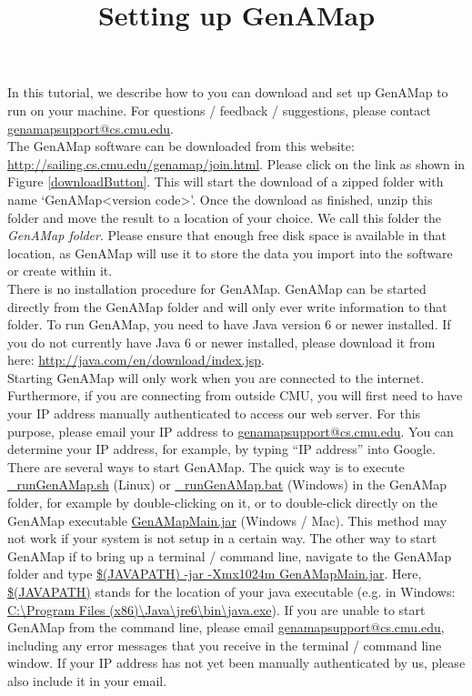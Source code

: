 \documentclass{article}
\title{Setting up GenAMap}
\author{}
\date{}
\begin{document}
\maketitle


In this tutorial, we describe how to you can download and set up GenAMap to run on your machine. For questions / feedback / suggestions, please contact \url{genamapsupport@cs.cmu.edu}.\\

The GenAMap software can be downloaded from this website: \url{http://sailing.cs.cmu.edu/genamap/join.html}. Please click on the link as shown in Figure \ref{downloadButton}. This will start the download of a zipped folder with name `GenAMap\textless version code\textgreater'. Once the download as finished, unzip this folder and move the result to a location of your choice. We call this folder the {\it GenAMap folder}. Please ensure that enough free disk space is available in that location, as GenAMap will use it to store the data you import into the software or create within it.\\

There is no installation procedure for GenAMap. GenAMap can be started directly from the GenAMap folder and will only ever write information to that folder. To run GenAMap, you need to have Java version 6 or newer installed. If you do not currently have Java 6 or newer installed, please download it from here: \url{http://java.com/en/download/index.jsp}.\\

Starting GenAMap will only work when you are connected to the internet. Furthermore, if you are connecting from outside CMU, you will first need to have your IP address manually authenticated to access our web server. For this purpose, please email your IP address to \url{genamapsupport@cs.cmu.edu}. You can determine your IP address, for example, by typing ``IP address'' into Google.\\

There are several ways to start GenAMap. The quick way is to execute \url{_runGenAMap.sh} (Linux) or \url{_runGenAMap.bat} (Windows) in the GenAMap folder, for example by double-clicking on it, or to double-click directly on the GenAMap executable \url{GenAMapMain.jar} (Windows / Mac). This method may not work if your system is not setup in a certain way. The other way to start GenAMap if to bring up a terminal / command line, navigate to the GenAMap folder and type \url{$(JAVAPATH) -jar -Xmx1024m GenAMapMain.jar}. Here, \url{$(JAVAPATH)} stands for the location of your java executable (e.g. in Windows: \url{C:\Program Files (x86)\Java\jre6\bin\java.exe}). If you are unable to start GenAMap from the command line, please email \url{genamapsupport@cs.cmu.edu}, including any error messages that you receive in the terminal / command line window. If your IP address has not yet been manually authenticated by us, please also include it in your email.\\
\end{document}
